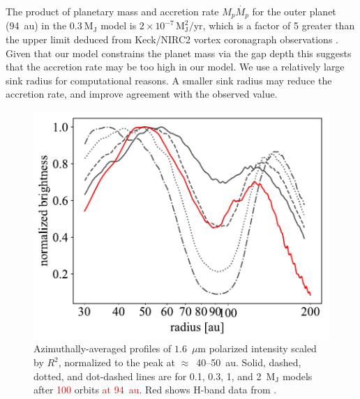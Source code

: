 \documentclass[usenatbib,a4paper,times]{mnras}
\newcommand{\new}[1]{{\textcolor{red}{#1}}}
\begin{document}
The product of planetary mass and accretion rate $M_p\dot{M_p}$ for the outer
planet (94~au) in the $0.3~\mathrm{M_J}$ model is $2\times 10^{-7}\,
\mathrm{M_J^2/yr}$, which is a factor of 5 greater than the upper limit deduced
from Keck/NIRC2 vortex coronagraph observations \citep{ruane:2017}. Given that
our model constrains the planet mass via the gap depth this suggests that the
accretion rate may be too high in our model. We use a relatively large sink
radius for computational reasons. A smaller sink radius may reduce the accretion
rate, and improve agreement with the observed value.

\begin{figure}
   \begin{center}
      \includegraphics[width=1.00\columnwidth]{figs/scattered-radial.pdf}
      \caption{Azimuthally-averaged profiles of $1.6$~$\mu$m polarized
         intensity scaled by $R^2$, normalized to the
         peak at $\approx$~40--50~au. Solid, dashed, dotted, and dot-dashed
         lines are for 0.1, 0.3, 1, and 2~$\mathrm{M_J}$ models after
         \new{100} orbits \new{at 94~au}. Red shows H-band data
         from \citet{van-boekel:2017}.\label{fig:scattered-radial}}
   \end{center}
\end{figure}
\end{document}
